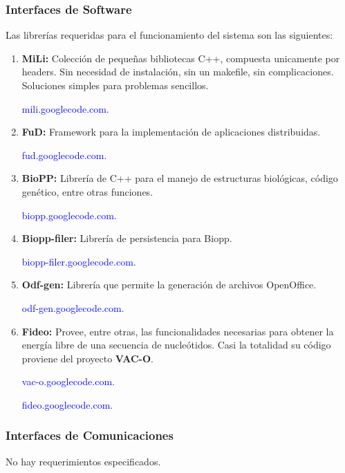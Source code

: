 \documentclass[12pt,a4paper,spanish]{article}
\begin{document}
	\subsubsection{Interfaces de Software}
		\par Las librerías requeridas para el funcionamiento del sistema son las siguientes:
		\begin{enumerate} 		
			\item \textbf{MiLi:} Colección de pequeñas bibliotecas C++, compuesta unicamente por headers. Sin necesidad de instalación, sin un 									makefile, sin complicaciones. Soluciones simples para problemas sencillos.
						\par \noindent \textcolor{blue}{mili.googlecode.com.}

			\item \textbf{FuD:} Framework para la implementación de aplicaciones distribuidas. 
						\par \noindent \textcolor{blue}{fud.googlecode.com.}

			\item \textbf{BioPP:} Librería de C++ para el manejo de estructuras biológicas, código
						genético, entre otras funciones. 
						\par \noindent \textcolor{blue}{biopp.googlecode.com.}

			\item \textbf{Biopp-filer:} Librería de persistencia para Biopp. 
						\par \noindent \textcolor{blue}{biopp-filer.googlecode.com.} 

			\item \textbf{Odf-gen:} Librería que permite la generación de archivos OpenOffice.
						\par \noindent \textcolor{blue}{odf-gen.googlecode.com.}

			\item \textbf{Fideo:} Provee, entre otras, las funcionalidades necesarias para obtener la energía libre de una 									 secuencia de nucleótidos.
								  Casi la totalidad su código proviene del proyecto \textbf{VAC-O}.
						\par \noindent \textcolor{blue}{vac-o.googlecode.com.}
						\par \noindent \textcolor{blue}{fideo.googlecode.com.}  
		\end{enumerate}

	\subsubsection{Interfaces de Comunicaciones}
		No hay requerimientos especificados.
\end{document}
